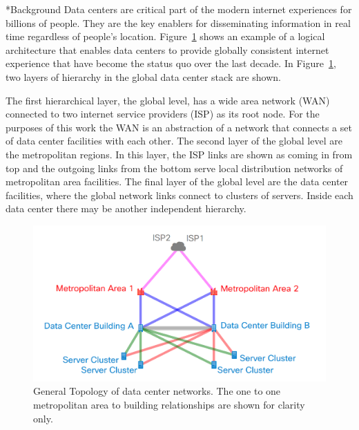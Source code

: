 \documentclass[twocolumn, a4paper,10pt]{article}
\makeatletter
\renewcommand\section{\@startsection{section}{1}{\z@}{3pt}{3pt}{\normalfont\large\bfseries}}
\makeatother
\begin{document}
\section*{Background}
Data centers are critical part of the modern internet experiences for billions of people. They are the key enablers for disseminating information in real time regardless of people's location. Figure~\ref{fig:net_diag} shows an example of a logical architecture that enables data centers to provide globally consistent internet experience that have become the status quo over the last decade. In Figure~\ref{fig:net_diag}, two layers of hierarchy in the global data center stack are shown. 

The first hierarchical layer, the global level, has a wide area network (WAN) connected to two internet service providers (ISP) as its root node. For the purposes of this work the WAN is an abstraction of a network that connects a set of data center facilities with each other. The second layer of the global level are the metropolitan regions. In this layer, the ISP links are shown as coming in from top and the outgoing links from the bottom serve local distribution networks of metropolitan area facilities. The final layer of the global level are the data center facilities, where the global network links connect to clusters of servers. Inside each data center there may be another independent hierarchy.

\begin{figure}
  \centering
  \includegraphics[scale=.2]{img/net_diag.png}
  \caption{General Topology of data center networks. The one to one metropolitan area to building relationships are shown for clarity only.}
  \label{fig:net_diag}
  \end{figure}
\end{document}
